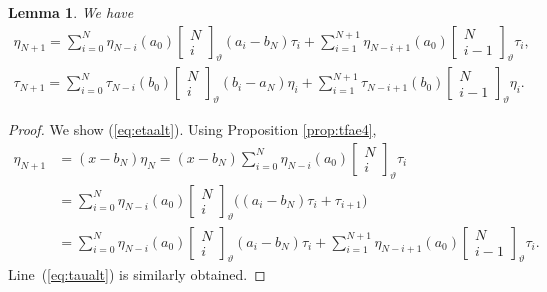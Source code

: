 \documentclass[pdftex]{sigma}
\numberwithin{equation}{section}
\newtheorem{Lemma}[Theorem]{Lemma}
\begin{document}
\begin{Lemma}\label{lem:etalt}
We have
\begin{gather}
\eta_{N+1}= \sum_{i=0}^N \eta_{N-i}(a_0)
\left[\begin{matrix} N \\
i \end{matrix} \right]_\vartheta
(a_i-b_N)\tau_i
 + \sum_{i=1}^{N+1} \eta_{N-i+1}(a_0)
\left[\begin{matrix} N \\
i-1 \end{matrix} \right]_\vartheta \tau_i,
\label{eq:etaalt}
\\
\tau_{N+1}= \sum_{i=0}^N \tau_{N-i}(b_0)
\left[\begin{matrix} N \\
i \end{matrix} \right]_\vartheta
(b_i-a_N)\eta_i
 + \sum_{i=1}^{N+1} \tau_{N-i+1}(b_0)
\left[\begin{matrix} N \\
i-1 \end{matrix} \right]_\vartheta \eta_i.\label{eq:taualt}
\end{gather}
\end{Lemma}
\begin{proof} We show
(\ref{eq:etaalt}). Using Proposition
\ref{prop:tfae4},
\begin{align*}
\eta_{N+1} & = (x-b_N)\eta_N
= (x-b_N)\sum_{i=0}^N \eta_{N-i}(a_0)
\left[\begin{matrix} N \\
i \end{matrix} \right]_\vartheta \tau_i
\\
&= \sum_{i=0}^N \eta_{N-i}(a_0)
\left[\begin{matrix} N \\
i \end{matrix} \right]_\vartheta
\bigl((a_i-b_N)\tau_i+\tau_{i+1}\bigr)
\\
&= \sum_{i=0}^N \eta_{N-i}(a_0)
\left[\begin{matrix} N \\
i \end{matrix} \right]_\vartheta
(a_i-b_N)\tau_i
 + \sum_{i=1}^{N+1} \eta_{N-i+1}(a_0)
\left[\begin{matrix} N \\
i-1 \end{matrix} \right]_\vartheta
\tau_i.
\end{align*}
Line~(\ref{eq:taualt}) is similarly obtained.
\end{proof}
\end{document}
